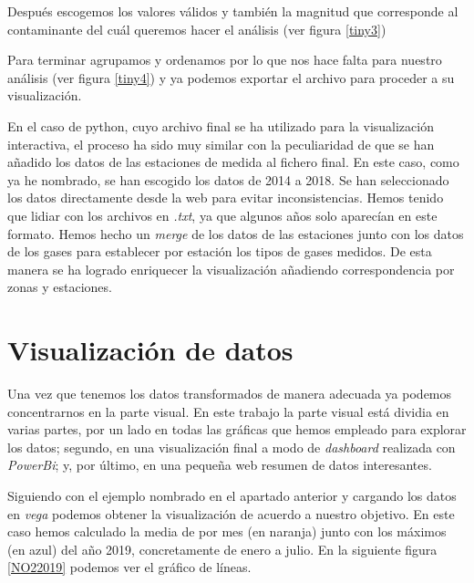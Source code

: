 
Después escogemos los valores válidos y también la magnitud que corresponde al contaminante del cuál queremos hacer el análisis (ver figura \ref{tiny3})


Para terminar agrupamos y ordenamos por lo que nos hace falta para nuestro análisis (ver figura \ref{tiny4}) y ya podemos exportar el archivo para proceder a su visualización.


 En el caso de python, cuyo archivo final se ha utilizado para la visualización interactiva, el proceso ha sido muy similar con la peculiaridad de que se han añadido los datos de las estaciones de medida al fichero final. En este caso, como ya he nombrado, se han escogido los datos de 2014 a 2018. Se han seleccionado los datos directamente desde la web para evitar inconsistencias. Hemos tenido que lidiar con los archivos en \textit{.txt}, ya que algunos años solo aparecían en este formato. Hemos hecho un \textit{merge} de los datos de las estaciones junto con los datos de los gases para establecer por estación los tipos de gases medidos. De esta manera se ha logrado enriquecer la visualización añadiendo correspondencia por zonas y estaciones.

\section{Visualización de datos}
Una vez que tenemos los datos transformados de manera adecuada ya podemos concentrarnos en la parte visual. En este trabajo la parte visual está dividia en varias partes, por un lado en todas las gráficas que hemos empleado para explorar los datos; segundo, en una visualización final a modo de \textit{dashboard} realizada con \textit{PowerBi}; y, por último, en una pequeña web resumen de datos interesantes.


Siguiendo con el ejemplo nombrado en el apartado anterior y cargando los datos en \textit{vega} podemos obtener la visualización de acuerdo a nuestro objetivo. En este caso hemos calculado la media de  por mes (en naranja) junto con los máximos (en azul)  del año 2019, concretamente de enero a julio. En la siguiente figura \ref{NO22019} podemos ver el gráfico de líneas.

